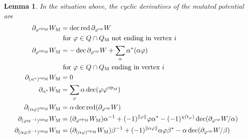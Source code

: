 \documentclass[a4paper,11pt]{amsart}
\newtheorem{lemma}[theorem]{Lemma}
\theoremstyle{definition}
\DeclareMathOperator{\op}{op}
\DeclareMathOperator{\red}{red}
\DeclareMathOperator{\dec}{dec}
\newcommand{\m}{_{\rm M}}
\newcommand{\ci}[1]{\chi(#1)}
\newcommand{\ta}[1]{\operatorname{t}_{#1}}
\numberwithin{theorem}{section}
\begin{document}
\begin{lemma} \label{lem.der_of_mutated}
In the situation above, the cyclic derivatives of the mutated potential are
\begin{align*}
\partial_{\varphi^{\op\m}} W\m & = \dec \red \partial_{\varphi^{\op}} W \\ & \text{ for } \varphi \in Q \cap Q\m \text{ not ending in vertex $i$} \\
\partial_{\varphi^{\op\m}} W\m & = - \dec \partial_{\varphi^{\op}} W + \sum_{\alpha} \alpha^* (\alpha \varphi) \\ & \text{ for } \varphi \in Q \cap Q\m \text{ ending in vertex $i$} \\
\partial_{(\alpha^*)^{\op\m}} W\m & = 0 \\
\partial_{\alpha^*} W\m & = \sum_{\varphi} \alpha \dec( \varphi \varphi^{\op\m} ) \\
\partial_{(\alpha \varphi)^{\op\m}} W\m & = \alpha \dec \red (\partial_{\varphi^{\op}} W) \\
\partial_{(\varphi \alpha^{-1})^{\op\m}} W\m & = (\partial_{\varphi^{\op\m}} W\m ) \alpha^{-1} + (-1)^{\| \varphi \|} \varphi \alpha^* - (-1)^{\ci{\ta\varphi}} \dec (\partial_{\varphi^{\op}} W / \alpha) \\
\partial_{(\alpha \varphi \beta^{-1})^{\op\m}} W\m & = (\partial_{(\alpha \varphi)^{\op\m}} W\m ) \beta^{-1} + (-1)^{ \| \alpha \varphi \|} \alpha \varphi \beta^* - \alpha \dec (\partial_{\varphi^{\op}} W / \beta)
\end{align*}
\end{lemma}
\end{document}
